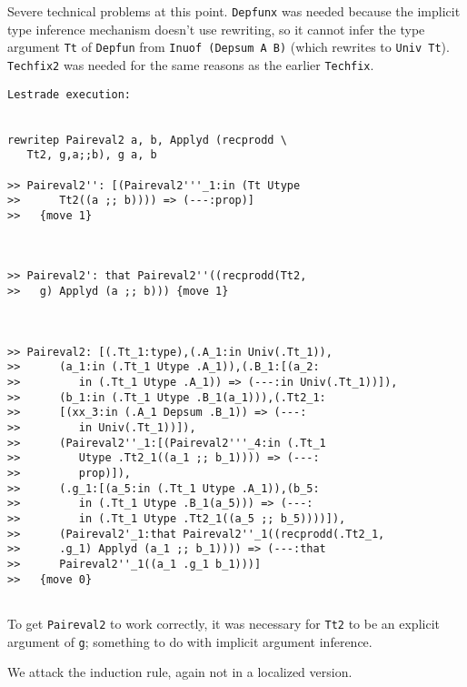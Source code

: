 \documentclass{article}
\begin{document}
Severe technical problems at this point.  {\tt Depfunx} was needed because the implicit type inference mechanism doesn't use rewriting,
so it cannot infer the type argument {\tt Tt} of {\tt Depfun} from {\tt Inuof (Depsum A B)} (which rewrites to {\tt Univ Tt}).
{\tt Techfix2} was needed for the same reasons as the earlier {\tt Techfix}.

\begin{verbatim}Lestrade execution:


rewritep Paireval2 a, b, Applyd (recprodd \
   Tt2, g,a;;b), g a, b

>> Paireval2'': [(Paireval2'''_1:in (Tt Utype
>>      Tt2((a ;; b)))) => (---:prop)]
>>   {move 1}



>> Paireval2': that Paireval2''((recprodd(Tt2,
>>   g) Applyd (a ;; b))) {move 1}



>> Paireval2: [(.Tt_1:type),(.A_1:in Univ(.Tt_1)),
>>      (a_1:in (.Tt_1 Utype .A_1)),(.B_1:[(a_2:
>>         in (.Tt_1 Utype .A_1)) => (---:in Univ(.Tt_1))]),
>>      (b_1:in (.Tt_1 Utype .B_1(a_1))),(.Tt2_1:
>>      [(xx_3:in (.A_1 Depsum .B_1)) => (---:
>>         in Univ(.Tt_1))]),
>>      (Paireval2''_1:[(Paireval2'''_4:in (.Tt_1
>>         Utype .Tt2_1((a_1 ;; b_1)))) => (---:
>>         prop)]),
>>      (.g_1:[(a_5:in (.Tt_1 Utype .A_1)),(b_5:
>>         in (.Tt_1 Utype .B_1(a_5))) => (---:
>>         in (.Tt_1 Utype .Tt2_1((a_5 ;; b_5))))]),
>>      (Paireval2'_1:that Paireval2''_1((recprodd(.Tt2_1,
>>      .g_1) Applyd (a_1 ;; b_1)))) => (---:that
>>      Paireval2''_1((a_1 .g_1 b_1)))]
>>   {move 0}


\end{verbatim}

To get {\tt Paireval2} to work correctly, it was necessary for {\tt Tt2} to be an explicit argument of {\tt g}; something to do with implicit argument inference.

We attack the induction rule, again not in a localized version.
\end{document}
